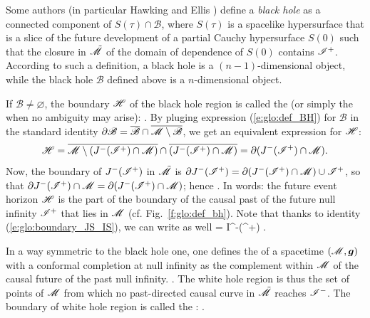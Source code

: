 \begin{remark}
Some authors (in particular Hawking and Ellis \cite{HawkiE73}) define a
\emph{black hole} as a connected component of
$S(\tau) \cap \mathscr{B}$, where $S(\tau)$ is a spacelike
hypersurface that is a slice of the future development of a partial
Cauchy hypersurface $S(0)$ such that the
closure in $\tilde{\mathscr{M}}$ of the domain of dependence of $S(0)$ contains $\mathscr{I}^+$.
According to such a definition, a black hole is a $(n-1)$-dimensional object,
while the black hole $\mathscr{B}$ defined above is a $n$-dimensional object.
\end{remark}

If $\mathscr{B}\not=\varnothing$, the boundary $\mathscr{H}$ of the black hole region
is called the 
(or simply the 
when no ambiguity may arise):
\be
    .
\ee
By pluging expression (\ref{e:glo:def_BH}) for $\mathscr{B}$ in the standard
identity $\partial \mathscr{B} =
\overline{\mathscr{B}} \cap \overline{\mathscr{M}\setminus \mathscr{B}}$, we get
an equivalent expression for $\mathscr{H}$:
\[
    \mathscr{H} = \overline{\mathscr{M} \setminus (J^-(\mathscr{I}^+)\cap\mathscr{M})} \cap
        \overline{(J^-(\mathscr{I}^+)\cap\mathscr{M})}
        = \partial(J^-(\mathscr{I}^+)\cap\mathscr{M}) .
\]
Now, the boundary of $J^-(\mathscr{I}^+)$ in $\tilde{\mathscr{M}}$ is
$\partial J^-(\mathscr{I}^+) = \partial (J^-(\mathscr{I}^+)\cap\mathscr{M}) \cup \mathscr{I}^+$, so that
$\partial J^-(\mathscr{I}^+) \cap \mathscr{M} =  \partial(J^-(\mathscr{I}^+)\cap\mathscr{M})$; hence
\be
    .
\ee
In words: the future event horizon $\mathscr{H}$ is the part of the boundary of the causal past
of the future null infinity $\mathscr{I}^+$ that lies in $\mathscr{M}$ (cf. Fig.~\ref{f:glo:def_bh}).
Note that thanks to identity (\ref{e:glo:boundary_JS_IS}), we can write as
well
\be
    \Hor = \partial I^-(\scri^+) \cap \M .
\ee

In a way symmetric to the black hole one, one defines
the  of a
spacetime $(\mathscr{M},\bm{g})$ with a conformal completion at null infinity as the
complement within $\mathscr{M}$ of the causal future of the past null infinity.
\be
     .
\ee
The white hole region is thus the set of points of $\mathscr{M}$
from which no past-directed causal curve in $\tilde{\mathscr{M}}$ reaches $\mathscr{I}^-$.
The boundary of white hole region is called the
:
\be
     .
\ee

